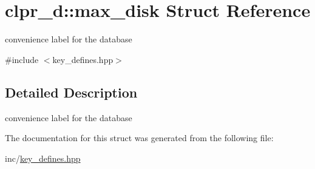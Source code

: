 \hypertarget{structclpr__d_1_1max__disk}{\section{clpr\-\_\-d\-:\-:max\-\_\-disk \-Struct \-Reference}
\label{structclpr__d_1_1max__disk}
}


convenience label for the database  




{\ttfamily \#include $<$key\-\_\-defines.\-hpp$>$}



\subsection{\-Detailed \-Description}
convenience label for the database 

\-The documentation for this struct was generated from the following file\-:\begin{DoxyCompactItemize}
\item 
inc/\hyperlink{key__defines_8hpp}{key\-\_\-defines.\-hpp}\end{DoxyCompactItemize}
